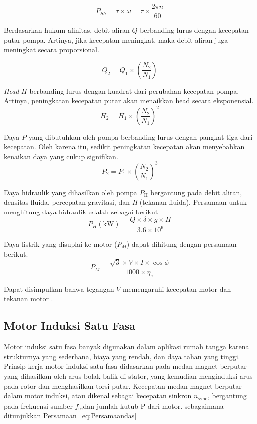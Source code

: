 \begin{equation}
P_{Sh} = \tau \times \omega = \tau \times \frac{2\pi n}{60}
\end{equation}

Berdasarkan hukum afinitas, debit aliran $Q$ berbanding lurus dengan kecepatan putar
pompa. Artinya, jika kecepatan meningkat, maka debit aliran juga meningkat secara
proporsional.

\begin{equation}
Q_2 = Q_1 \times \left( \frac{N_2}{N_1} \right)
\end{equation}

\emph{Head} $H$ berbanding lurus dengan kuadrat dari perubahan kecepatan pompa. Artinya,
peningkatan kecepatan putar akan menaikkan head secara eksponensial.
\begin{equation}
H_2 = H_1 \times \left( \frac{N_2}{N_1} \right)^2
\end{equation}

Daya $P$ yang dibutuhkan oleh pompa berbanding lurus dengan pangkat tiga dari kecepatan.
Oleh karena itu, sedikit peningkatan kecepatan akan menyebabkan kenaikan daya yang cukup
signifikan.
\begin{equation}
P_2 = P_1 \times \left( \frac{N_2}{N_1} \right)^3
\end{equation}

Daya hidraulik yang dihasilkan oleh pompa $P_{\text{H}}$ bergantung pada debit aliran,
densitas fluida, percepatan gravitasi, dan \emph{H} (tekanan fluida). Persamaan untuk
menghitung daya hidraulik adalah sebagai berikut
\begin{equation}
P_H (\text{kW}) = \frac{Q \times \delta \times g \times H}{3.6 \times 10^6}
\end{equation}

Daya listrik yang disuplai ke motor (\(P_M\)) dapat dihitung dengan persamaan berikut.
\begin{equation}
P_M = \frac{\sqrt{3} \times V \times I \times \cos\phi}{1000 \times \eta_e}
\end{equation}

Dapat disimpulkan bahwa tegangan $V$ memengaruhi kecepatan motor dan tekanan motor
\parencite{GIRDHAR200548}.


\subsection{Motor Induksi Satu Fasa}

Motor induksi satu fasa banyak digunakan dalam aplikasi rumah tangga karena strukturnya
yang sederhana, biaya yang rendah, dan daya tahan yang tinggi. Prinsip kerja motor
induksi satu fasa didasarkan pada medan magnet berputar yang dihasilkan oleh arus
bolak-balik di stator, yang kemudian menginduksi arus pada rotor dan menghasilkan torsi
putar. Kecepatan medan magnet berputar dalam motor induksi, atau dikenal sebagai
kecepatan sinkron $n_{\text{sync}}$, bergantung pada frekuensi sumber $f_{\text{e}}$,dan
jumlah kutub P dari motor. sebagaimana ditunjukkan Persamaan~\eqref{eq:Persamaandas}

